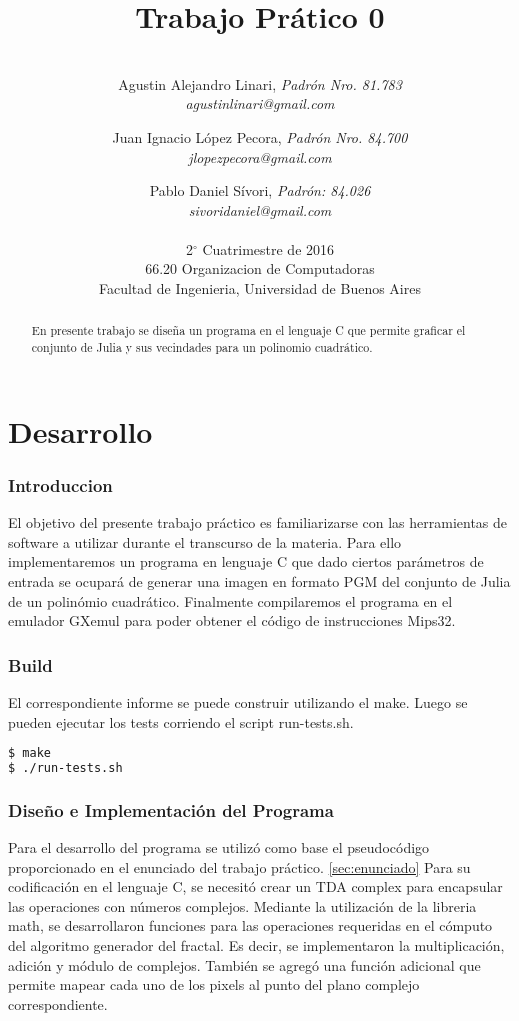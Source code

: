 \documentclass{article}
\title{Trabajo Prático 0}
\author{\\
  Agustin Alejandro Linari, \textit{Padrón Nro. 81.783}\\
  \textit{agustinlinari@gmail.com}\\
  \and
  Juan Ignacio López Pecora, \textit{Padrón Nro. 84.700}\\
  \textit{jlopezpecora@gmail.com}\\
  \and
  Pablo Daniel Sívori, \textit{Padrón: 84.026}\\
  \textit{sivoridaniel@gmail.com}\\
  \\
  \normalsize{2$^{\circ}$ Cuatrimestre de 2016}                           \\
  \normalsize{66.20 Organizacion de Computadoras}                  \\
  \normalsize{Facultad de Ingenieria, Universidad de Buenos Aires} \\
}
\begin{document}

\maketitle                   %

\begin{abstract}
En presente trabajo se diseña un programa en el lenguaje C que permite graficar el conjunto de Julia y sus vecindades para un polinomio cuadrático. 
\end{abstract}

\clearpage

\tableofcontents
\clearpage

\part{Desarrollo}

\section{Introduccion}

El objetivo del presente trabajo práctico es familiarizarse con las herramientas de software a utilizar durante el transcurso de la materia. Para ello implementaremos un programa en lenguaje C que dado ciertos parámetros de entrada se ocupará de generar una imagen en formato PGM del conjunto de Julia de un polinómio cuadrático. 
Finalmente compilaremos el programa en el emulador GXemul para poder obtener el código de instrucciones Mips32.

\section{Build}
El correspondiente informe se puede construir utilizando el make. Luego se pueden ejecutar los tests corriendo el script run-tests.sh.
\begin{lstlisting}[language=bash]
$ make
$ ./run-tests.sh
\end{lstlisting}

\section{Diseño e Implementación del Programa}
Para el desarrollo del programa se utilizó como base el pseudocódigo proporcionado en el enunciado del trabajo práctico. \ref{sec:enunciado}
Para su codificación en el lenguaje C, se necesitó crear un TDA complex para encapsular las operaciones con números complejos. Mediante la utilización de la libreria math, se desarrollaron funciones para las operaciones requeridas en el cómputo del algoritmo generador del fractal. Es decir, se implementaron la multiplicación, adición y módulo de complejos. También se agregó una función adicional que permite mapear cada uno de los pixels al punto del plano complejo correspondiente. 
\end{document}
